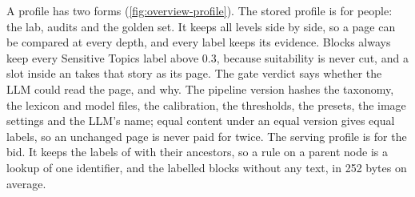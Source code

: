 A profile has two forms (\cref{fig:overview-profile}). The stored profile is for people: the lab, audits and the golden set. It keeps all levels side by side, so a page can be compared at every depth, and every label keeps its evidence. Blocks always keep every Sensitive Topics label above 0.3, because suitability is never cut, and a slot inside an  takes that story as its page. The gate verdict says whether the LLM could read the page, and why. The pipeline version hashes the taxonomy, the lexicon and model files, the calibration, the thresholds, the presets, the image settings and the LLM's name; equal content under an equal version gives equal labels, so an unchanged page is never paid for twice. The serving profile is for the bid. It keeps the labels of  with their ancestors, so a rule on a parent node is a lookup of one identifier, and the labelled blocks without any text, in 252 bytes on average.

